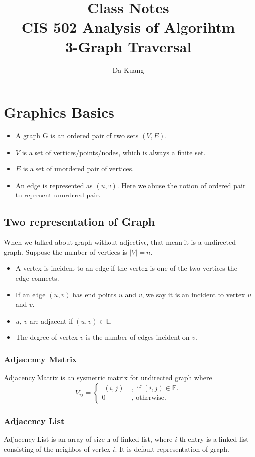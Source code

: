 \documentclass[en,hazy,blue,screen,14pt]{elegantnote}
\title{Class Notes\\CIS 502 Analysis of Algorihtm\\3-Graph Traversal}
\author{Da Kuang}
\institute{University of Pennsylvania}
\date{}
\begin{document}
\maketitle
\newpage
\section{Graphics Basics}
\begin{itemize}
\item A graph G is an ordered pair of two sets $(V, E)$.
\item $V$ is a set of vertices/points/nodes, which is always a finite set.
\item $E$ is a set of unordered pair of vertices.
\item An edge is represented as $(u ,v)$. Here we abuse the notion of ordered 
pair to represent unordered pair.
\end{itemize}

\subsection{Two representation of Graph}
When we talked about graph without adjective, that mean it is a 
undirected graph. Suppose the number of vertices is $|V| = n$.
\begin{itemize}
 \item A vertex is incident to an edge if the vertex is one of the two vertices 
the edge connects.
\item If an edge $(u, v)$ has end points $u$ and $v$, we say it is an incident 
to vertex $u$ and $v$.
\item $u$, $v$ are adjacent if $(u, v) \in \mathbb{E}$.
\item The degree of vertex $v$ is the number of edges incident on $v$.
\end{itemize}

\subsubsection{Adjacency Matrix}
Adjacency Matrix is an sysmetric matrix for undirected graph where
\[
V_{ij} = 
\begin{cases*}
 |(i,j)| & ,\text{ if $(i,j) \in \mathbb{E}$.}\\
 0  &,\text{ otherwise.}
\end{cases*}
\]
\subsubsection{Adjacency List}
Adjacency List is an array of size n of linked list, where $i$-th entry is 
a linked list consisting of the neighbos of vertex-$i$. It is default 
representation of graph.
\end{document}
